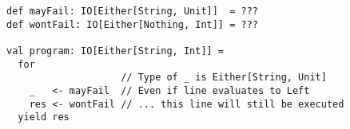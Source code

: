 \begin{algorithm}

\begin{verbatim}
def mayFail: IO[Either[String, Unit]]  = ???
def wontFail: IO[Either[Nothing, Int]] = ???

val program: IO[Either[String, Int]] =
  for
                    // Type of _ is Either[String, Unit]
    _   <- mayFail  // Even if line evaluates to Left
    res <- wontFail // ... this line will still be executed
  yield res
\end{verbatim}

\caption{Subtle bugs not causing early termination or compilation error. %
\label{monadtransformer:subtle-bugs}}
\end{algorithm}